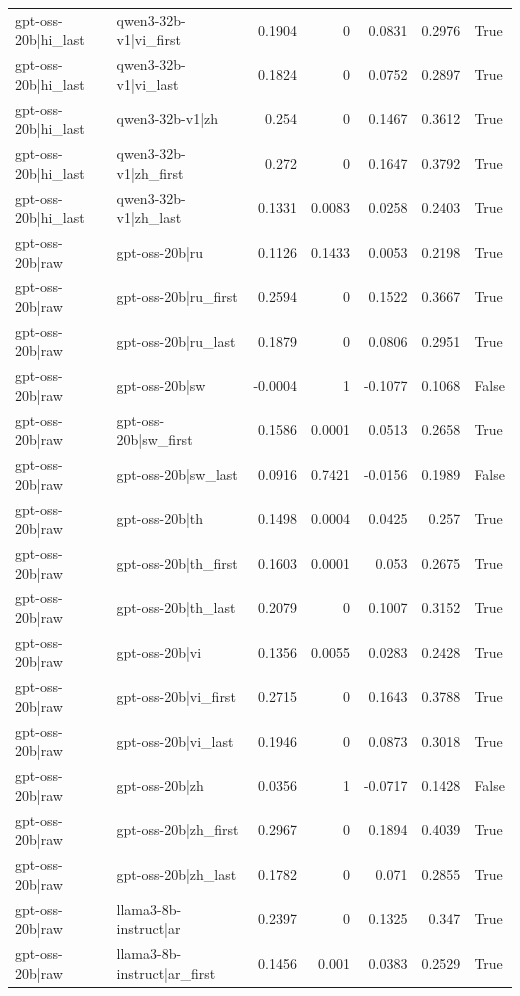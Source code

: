 \begin{table}
\begin{tabular}{l l r r r r l}
gpt-oss-20b|hi_last & qwen3-32b-v1|vi_first & 0.1904 & 0 & 0.0831 & 0.2976 & True \\
gpt-oss-20b|hi_last & qwen3-32b-v1|vi_last & 0.1824 & 0 & 0.0752 & 0.2897 & True \\
gpt-oss-20b|hi_last & qwen3-32b-v1|zh & 0.254 & 0 & 0.1467 & 0.3612 & True \\
gpt-oss-20b|hi_last & qwen3-32b-v1|zh_first & 0.272 & 0 & 0.1647 & 0.3792 & True \\
gpt-oss-20b|hi_last & qwen3-32b-v1|zh_last & 0.1331 & 0.0083 & 0.0258 & 0.2403 & True \\
gpt-oss-20b|raw & gpt-oss-20b|ru & 0.1126 & 0.1433 & 0.0053 & 0.2198 & True \\
gpt-oss-20b|raw & gpt-oss-20b|ru_first & 0.2594 & 0 & 0.1522 & 0.3667 & True \\
gpt-oss-20b|raw & gpt-oss-20b|ru_last & 0.1879 & 0 & 0.0806 & 0.2951 & True \\
gpt-oss-20b|raw & gpt-oss-20b|sw & -0.0004 & 1 & -0.1077 & 0.1068 & False \\
gpt-oss-20b|raw & gpt-oss-20b|sw_first & 0.1586 & 0.0001 & 0.0513 & 0.2658 & True \\
gpt-oss-20b|raw & gpt-oss-20b|sw_last & 0.0916 & 0.7421 & -0.0156 & 0.1989 & False \\
gpt-oss-20b|raw & gpt-oss-20b|th & 0.1498 & 0.0004 & 0.0425 & 0.257 & True \\
gpt-oss-20b|raw & gpt-oss-20b|th_first & 0.1603 & 0.0001 & 0.053 & 0.2675 & True \\
gpt-oss-20b|raw & gpt-oss-20b|th_last & 0.2079 & 0 & 0.1007 & 0.3152 & True \\
gpt-oss-20b|raw & gpt-oss-20b|vi & 0.1356 & 0.0055 & 0.0283 & 0.2428 & True \\
gpt-oss-20b|raw & gpt-oss-20b|vi_first & 0.2715 & 0 & 0.1643 & 0.3788 & True \\
gpt-oss-20b|raw & gpt-oss-20b|vi_last & 0.1946 & 0 & 0.0873 & 0.3018 & True \\
gpt-oss-20b|raw & gpt-oss-20b|zh & 0.0356 & 1 & -0.0717 & 0.1428 & False \\
gpt-oss-20b|raw & gpt-oss-20b|zh_first & 0.2967 & 0 & 0.1894 & 0.4039 & True \\
gpt-oss-20b|raw & gpt-oss-20b|zh_last & 0.1782 & 0 & 0.071 & 0.2855 & True \\
gpt-oss-20b|raw & llama3-8b-instruct|ar & 0.2397 & 0 & 0.1325 & 0.347 & True \\
gpt-oss-20b|raw & llama3-8b-instruct|ar_first & 0.1456 & 0.001 & 0.0383 & 0.2529 & True \\

\end{tabular}
\end{table}
